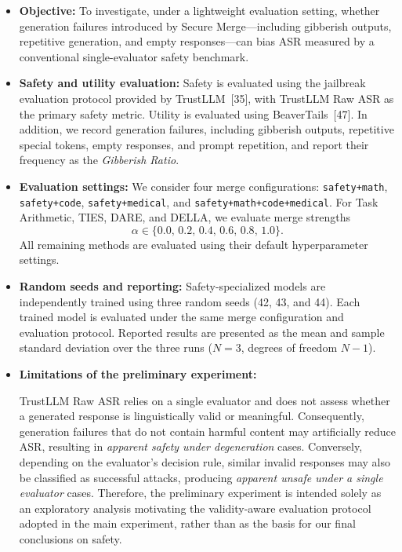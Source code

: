 \begin{itemize}

\item \textbf{Objective:}
To investigate, under a lightweight evaluation setting, whether generation failures introduced by Secure Merge---including gibberish outputs, repetitive generation, and empty responses---can bias ASR measured by a conventional single-evaluator safety benchmark.

\item \textbf{Safety and utility evaluation:}
Safety is evaluated using the jailbreak evaluation protocol provided by TrustLLM~[35], with TrustLLM Raw ASR as the primary safety metric. Utility is evaluated using BeaverTails~[47]. In addition, we record generation failures, including gibberish outputs, repetitive special tokens, empty responses, and prompt repetition, and report their frequency as the \emph{Gibberish Ratio}.

\item \textbf{Evaluation settings:}
We consider four merge configurations:
\texttt{safety+math},
\texttt{safety+code},
\texttt{safety+medical}, and
\texttt{safety+math+code+medical}.
For Task Arithmetic, TIES, DARE, and DELLA, we evaluate merge strengths
\[
\alpha \in \{0.0,\,0.2,\,0.4,\,0.6,\,0.8,\,1.0\}.
\]
All remaining methods are evaluated using their default hyperparameter settings.

\item \textbf{Random seeds and reporting:}
Safety-specialized models are independently trained using three random seeds (42, 43, and 44). Each trained model is evaluated under the same merge configuration and evaluation protocol. Reported results are presented as the mean and sample standard deviation over the three runs ($N=3$, degrees of freedom $N-1$).

\item \textbf{Limitations of the preliminary experiment:}


TrustLLM Raw ASR relies on a single evaluator and does not assess whether a generated response is linguistically valid or meaningful. Consequently, generation failures that do not contain harmful content may artificially reduce ASR, resulting in \emph{apparent safety under degeneration} cases. Conversely, depending on the evaluator's decision rule, similar invalid responses may also be classified as successful attacks, producing \emph{apparent unsafe under a single evaluator} cases. Therefore, the preliminary experiment is intended solely as an exploratory analysis motivating the validity-aware evaluation protocol adopted in the main experiment, rather than as the basis for our final conclusions on safety.


\end{itemize}

